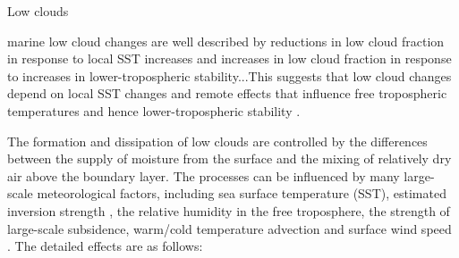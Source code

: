 Low clouds

marine low cloud changes are well described by reductions in low cloud fraction in response to local SST increases \citep[e.g.,][]{Rieck2012, Webb2013coupling, Qu2014, Bretherton2015, Brient2016,Ceppi2017relationship} and increases in low cloud fraction in response to increases in lower-tropospheric stability...This suggests that low cloud changes depend on local SST changes and remote effects that influence free tropospheric temperatures and hence lower-tropospheric stability \citep[e.g.,][]{Zhou2015,Zhou2016,Zhou2017,Andrews2018}. 

The formation and dissipation of low clouds are controlled by the differences between the supply of moisture from the surface and the mixing of relatively dry air above the boundary layer. The processes can be influenced by many large-scale meteorological factors, including sea surface temperature (SST), estimated inversion strength \citep[EIS;][]{Wood2006}, the relative humidity in the free troposphere, the strength of large-scale subsidence, warm/cold temperature advection and surface wind speed \citep{Scott2020}. The detailed effects are as follows:

